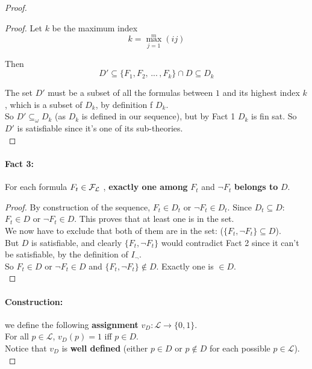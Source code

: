 \begin{proof}
\begin{proof}
			Let $k$ be the maximum index
			$$ k = \max_{j=1}^m (ij) $$

			Then
			$$ D' \subseteq \{F_1, F_2, \, ... \, , F_k\} \cap D \subseteq D_k$$

			The set $D'$ must be a subset of all the formulas between $1$ and its highest index $k$, which is a subset of $D_k$, by definition f $D_k$.\\

			So $D' \subseteq_\omega D_k$ (as $D_k$ is defined in our sequence), but by Fact 1 $D_k$ is fin sat. So $D'$ is satisfiable since it's one of its sub-theories.\\
		\end{proof}

		\newpage

		\paragraph{Fact 3:} For each formula $F_t \in \mathcal{F}_\mathcal{L}$ , \textbf{exactly one among} $F_t$ and $\neg F_t$ \textbf{belongs to} $D$.\\

		\begin{proof}
			By construction of the sequence, $F_t \in D_t$ or $\neg F_t \in D_t$. Since $D_t \subseteq D$: $F_t \in D$ or $\neg F_t \in D$. This proves that at least one is in the set. \\

			We now have to exclude that both of them are in the set: ($\{F_t, \neg F_t\} \subseteq D$).\\
			But $D$ is satisfiable, and clearly $\{F_t, \neg F_t\}$ would contradict Fact 2 since it can't be satisfiable, by the definition of $I_\neg$.\\

			So $F_t \in D$ or $\neg F_t \in D$ and $\{F_t, \neg F_t\} \notin D$. Exactly one is $\in D$.\\
		\end{proof}

		\paragraph{Construction:} we define the following \textbf{assignment} $v_D: \mathcal{L} \rightarrow \{0,1\}$.\\
		For all $p \in \mathcal{L}$, $v_D (p) = 1$ iff $p \in D$.\\

		Notice that $v_D$ is \textbf{well defined} (either $p \in D$ or $p \notin D$ for each possible $p \in \mathcal{L}$).\\


\end{proof}
